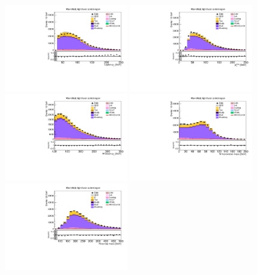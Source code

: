 \begin{figure}[tbp]
  \begin{center}
    \includegraphics[width=0.48\textwidth]{figures/wlnhbb2016/resolved/WenWHLightFlavorCR_lepton1Pt.pdf}
    \includegraphics[width=0.48\textwidth]{figures/wlnhbb2016/resolved/WenWHLightFlavorCR_pfmet.pdf}
    \includegraphics[width=0.48\textwidth]{figures/wlnhbb2016/resolved/WenWHLightFlavorCR_WpT.pdf}
    \includegraphics[width=0.48\textwidth]{figures/wlnhbb2016/resolved/WenWHLightFlavorCR_mTW.pdf}
    \includegraphics[width=0.48\textwidth]{figures/wlnhbb2016/resolved/WenWHLightFlavorCR_topMassLep1Met.pdf}

\end{center}
\end{figure}
